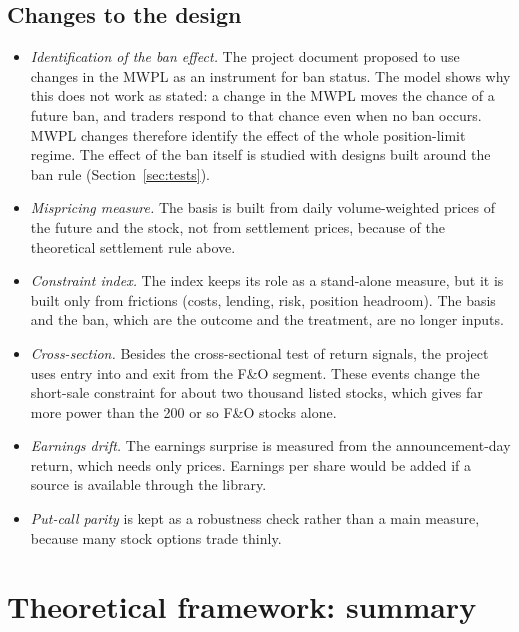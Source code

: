 \documentclass[11pt,a4paper]{article}
\begin{document}
\subsection{Changes to the design}
\begin{itemize}
\item \emph{Identification of the ban effect.} The project document proposed to use changes in the MWPL as an instrument for
ban status. The model shows why this does not work as stated: a change in the MWPL moves the chance of a future ban, and
traders respond to that chance even when no ban occurs. MWPL changes therefore identify the effect of the whole position-limit
regime. The effect of the ban itself is studied with designs built around the ban rule (Section~\ref{sec:tests}).
\item \emph{Mispricing measure.} The basis is built from daily volume-weighted prices of the future and the stock, not from
settlement prices, because of the theoretical settlement rule above.
\item \emph{Constraint index.} The index keeps its role as a stand-alone measure, but it is built only from frictions (costs,
lending, risk, position headroom). The basis and the ban, which are the outcome and the treatment, are no longer inputs.
\item \emph{Cross-section.} Besides the cross-sectional test of return signals, the project uses entry into and exit from the
F\&O segment. These events change the short-sale constraint for about two thousand listed stocks, which gives far more power
than the 200 or so F\&O stocks alone.
\item \emph{Earnings drift.} The earnings surprise is measured from the announcement-day return, which needs only prices.
Earnings per share would be added if a source is available through the library.
\item \emph{Put-call parity} is kept as a robustness check rather than a main measure, because many stock options trade thinly.
\end{itemize}

\section{Theoretical framework: summary}\label{sec:theory}
\end{document}
